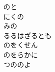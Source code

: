 \documentclass[10pt,b5j]{tarticle} %
\begin{document}
\begin{enumerate}
\begin{minipage}[c]{\blocksize}
        \vspace{\linespace}
        \item
        のと\\
        にくの\\
        みの\\
        るるはざるとも\\
        のをくせん\\
        のをらかに\\
        つののよ
    
    \end{minipage}
\end{enumerate} %
\end{document}
